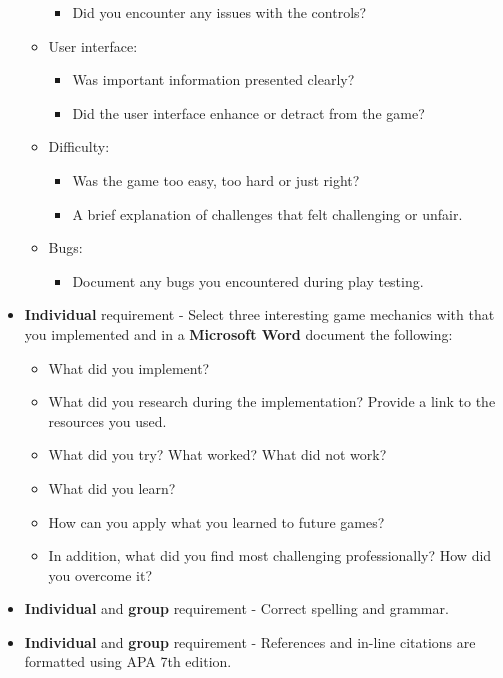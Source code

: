 \documentclass{article}
\begin{document}
\begin{itemize}
\begin{itemize}
\begin{itemize}
			\item Did you encounter any issues with the controls?
		\end{itemize}
		\item User interface:
		\begin{itemize}
			\item Was important information presented clearly?
			\item Did the user interface enhance or detract from the game?
		\end{itemize}
		\item Difficulty:
		\begin{itemize}
			\item Was the game too easy, too hard or just right?
			\item A brief explanation of challenges that felt challenging or unfair. 
		\end{itemize}  
		\item Bugs:
		\begin{itemize}
			\item Document any bugs you encountered during play testing.
		\end{itemize}
	\end{itemize}
	\item \textbf{Individual} requirement - Select three interesting game mechanics with that you implemented and in a \textbf{Microsoft Word} document the following:
		\begin{itemize}
			\item What did you implement?
			\item What did you research during the implementation? Provide a link to the resources you used.
			\item What did you try? What worked? What did not work?
			\item What did you learn?
			\item How can you apply what you learned to future games?	
			\item In addition, what did you find most challenging professionally? How did you overcome it?	
		\end{itemize}	
    \item \textbf{Individual} and \textbf{group} requirement - Correct spelling and grammar.
	\item \textbf{Individual} and \textbf{group} requirement - References and in-line citations are formatted using APA 7th edition.
\end{itemize}
\end{document}
